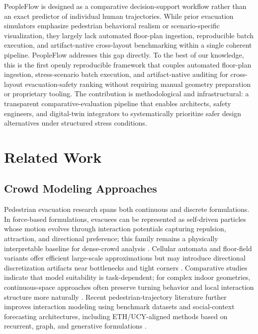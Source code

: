 \documentclass[journal]{IEEEtran}
\begin{document}
PeopleFlow is designed as a comparative decision-support workflow rather than an exact predictor of individual human trajectories.
While prior evacuation simulators emphasize pedestrian behavioral realism or scenario-specific visualization, they largely lack automated floor-plan ingestion, reproducible batch execution, and artifact-native cross-layout benchmarking within a single coherent pipeline. PeopleFlow addresses this gap directly. To the best of our knowledge, this is the first openly reproducible framework that couples automated floor-plan ingestion, stress-scenario batch execution, and artifact-native auditing for cross-layout evacuation-safety ranking without requiring manual geometry preparation or proprietary tooling. The contribution is methodological and infrastructural: a transparent comparative-evaluation pipeline that enables architects, safety engineers, and digital-twin integrators to systematically prioritize safer design alternatives under structured stress conditions.

\section{Related Work}
\subsection{Crowd Modeling Approaches}
Pedestrian evacuation research spans both continuous and discrete formulations. In force-based formulations, evacuees can be represented as self-driven particles whose motion evolves through interaction potentials capturing repulsion, attraction, and directional preference; this family remains a physically interpretable baseline for dense-crowd analysis \cite{sfm,helbing2000}. Cellular automata and floor-field variants offer efficient large-scale approximations but may introduce directional discretization artifacts near bottlenecks and tight corners \cite{ca,kirchner2002}. Comparative studies indicate that model suitability is task-dependent; for complex indoor geometries, continuous-space approaches often preserve turning behavior and local interaction structure more naturally \cite{zheng2009,duives2013,crowd_book}.
Recent pedestrian-trajectory literature further improves interaction modeling using benchmark datasets and social-context forecasting architectures, including ETH/UCY-aligned methods based on recurrent, graph, and generative formulations \cite{pellegrini2009eth,alahi2016sociallstm,gupta2018socialgan,salzmann2020trajectron,mohamed2020stgcnn,zhou2021astgnn,chen2021intention,li2020recurrent,wang2023timtraj,saleh2022transformer}.
\end{document}

